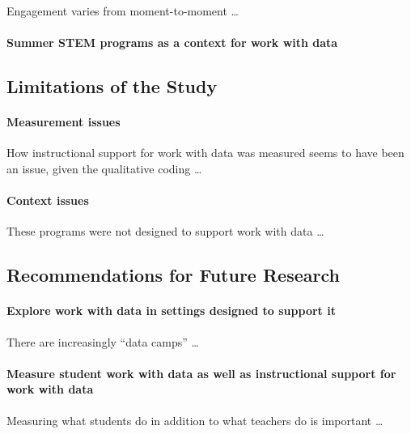\documentclass[]{msu-thesis}
\let\oldparagraph\paragraph
\renewcommand{\paragraph}[1]{\oldparagraph{#1}\mbox{}}
\theoremstyle{definition}
\theoremstyle{definition}
\theoremstyle{definition}
\theoremstyle{remark}
\begin{document}
Engagement varies from moment-to-moment \ldots{}

\paragraph{Summer STEM programs as a context for work with
data}\label{summer-stem-programs-as-a-context-for-work-with-data}

\subsection{Limitations of the Study}\label{limitations-of-the-study}

\paragraph{Measurement issues}\label{measurement-issues}

How instructional support for work with data was measured seems to have
been an issue, given the qualitative coding \ldots{}

\paragraph{Context issues}\label{context-issues}

These programs were not designed to support work with data \ldots{}

\subsection{Recommendations for Future
Research}\label{recommendations-for-future-research}

\paragraph{Explore work with data in settings designed to support
it}\label{explore-work-with-data-in-settings-designed-to-support-it}

There are increasingly ``data camps'' \ldots{}

\paragraph{Measure student work with data as well as instructional
support for work with
data}\label{measure-student-work-with-data-as-well-as-instructional-support-for-work-with-data}

Measuring what students do in addition to what teachers do is important
\ldots{}
\end{document}
